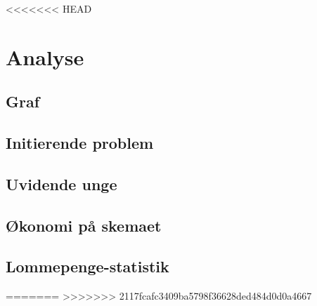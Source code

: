 





<<<<<<< HEAD
\tableofcontents

\chapter{Analyse}

\section{Graf}


\section{Initierende problem}


\section{Uvidende unge}
\label{UvidendeUnge}


\section{Økonomi på skemaet}
\label{Okonomi}


\section{Lommepenge-statistik}
\label{LommeStat}

=======
>>>>>>> 2117fcafc3409ba5798f36628ded484d0d0a4667

\tableofcontents










